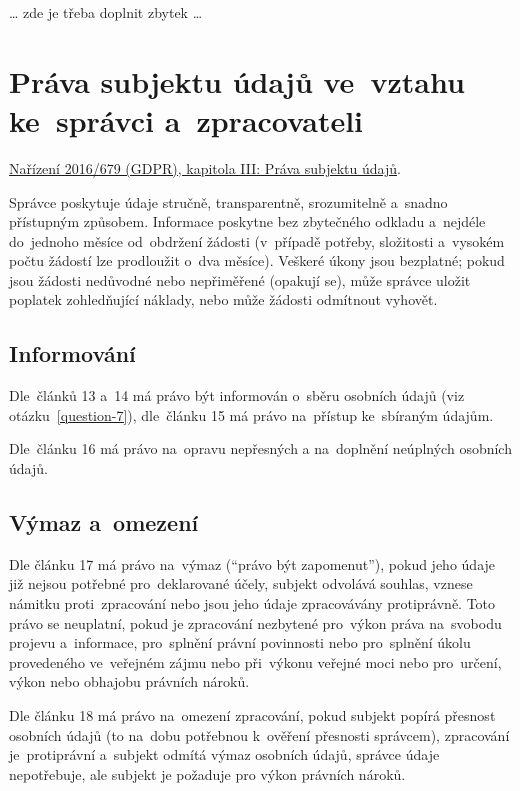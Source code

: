 \begin{center}
{\huge \dots} zde je třeba doplnit zbytek {\huge \dots}
\end{center}

\clearpage
\section{Práva subjektu údajů ve~vztahu ke~správci a~zpracovateli}

\href{https://eur-lex.europa.eu/legal-content/CS/TXT/HTML/?uri=CELEX:32016R0679#d1e2150-1-1}{Nařízení 2016/679 (GDPR), kapitola III: Práva subjektu údajů}.

Správce poskytuje údaje stručně, transparentně, srozumitelně a~snadno přístupným způsobem. Informace poskytne bez zbytečného odkladu a~nejdéle do~jednoho měsíce od~obdržení žádosti (v~případě potřeby, složitosti a~vysokém počtu žádostí lze prodloužit o~dva měsíce). Veškeré úkony jsou bezplatné; pokud jsou žádosti nedůvodné nebo nepřiměřené (opakují se), může správce uložit poplatek zohledňující náklady, nebo může žádosti odmítnout vyhovět.

\subsection*{Informování}

Dle~článků 13 a~14 má právo být informován o~sběru osobních údajů (viz otázku~\ref{question-7}), dle~článku 15 má právo na~přístup ke~sbíraným údajům.

Dle~článku 16 má právo na~opravu nepřesných a na~doplnění neúplných osobních údajů.

\subsection*{Výmaz a~omezení}

Dle článku 17 má právo na~výmaz (\enquote{právo být zapomenut}), pokud jeho údaje již nejsou potřebné pro~deklarované účely, subjekt odvolává souhlas, vznese námitku proti~zpracování nebo jsou jeho údaje zpracovávány protiprávně. Toto právo se neuplatní, pokud je zpracování nezbytené pro~výkon práva na~svobodu projevu a~informace, pro~splnění právní povinnosti nebo pro~splnění úkolu provedeného ve~veřejném zájmu nebo při~výkonu veřejné moci nebo pro~určení, výkon nebo obhajobu právních nároků.

Dle článku 18 má právo na~omezení zpracování, pokud subjekt popírá přesnost osobních údajů (to na~dobu potřebnou k~ověření přesnosti správcem), zpracování je~protiprávní a~subjekt odmítá výmaz osobních údajů, správce údaje nepotřebuje, ale subjekt je požaduje pro výkon právních nároků.

